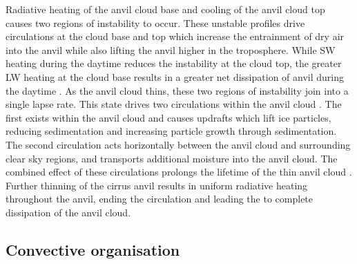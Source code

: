 Radiative heating of the anvil cloud base and cooling of the anvil cloud top causes two regions of instability to occur. 
These unstable profiles drive circulations at the cloud base and top which increase the entrainment of dry air into the anvil while also lifting the anvil higher in the troposphere. 
While SW heating during the daytime reduces the instability at the cloud top, the greater LW heating at the cloud base results in a greater net dissipation of anvil during the daytime \citep{sokol_tropical_2020}. 
As the anvil cloud thins, these two regions of instability join into a single lapse rate. 
This state drives two circulations within the anvil cloud \citep{gasparini_opinion_2023}. 
The first exists within the anvil cloud and causes updrafts which lift ice particles, reducing sedimentation and increasing particle growth through sedimentation. 
The second circulation acts horizontally between the anvil cloud and surrounding clear sky regions, and transports additional moisture into the anvil cloud. 
The combined effect of these circulations prolongs the lifetime of the thin anvil cloud \citep{sokol_tropical_2020}. 
Further thinning of the cirrus anvil results in uniform radiative heating throughout the anvil, ending the circulation and leading the to complete dissipation of the anvil cloud. 


\subsection{Convective organisation}

